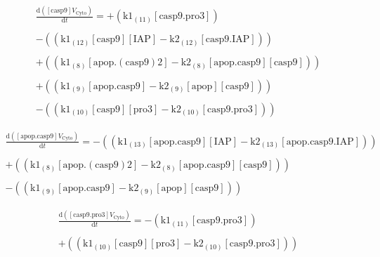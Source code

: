 \documentclass[a4paper,12pt]{article} %
\newcommand{\M}[1]{\mathrm{#1}}
\begin{document}
\begin{equation}
\begin{split}
\frac {\M{d}( {{\M{[casp9]}}    {V}_{\M{Cyto}} } ) }  {\M{d}{t} }  =  {  +  ( {{\M{k1}}_{\M{(11)}}    {\M{[casp9.pro3]}} } ) } \\ 
  \\ 
   {  -  (( {{\M{k1}}_{\M{(12)}}    {\M{[casp9]}}    {\M{[IAP]}}  -  {\M{k2}}_{\M{(12)}}    {\M{[casp9.IAP]}} } )) } \\ 
  \\ 
   {  +  (( {{\M{k1}}_{\M{(8)}}    {\M{[apop.(casp9)2]}}  -  {\M{k2}}_{\M{(8)}}    {\M{[apop.casp9]}}    {\M{[casp9]}} } )) } \\ 
  \\ 
   {  +  (( {{\M{k1}}_{\M{(9)}}    {\M{[apop.casp9]}}  -  {\M{k2}}_{\M{(9)}}    {\M{[apop]}}    {\M{[casp9]}} } )) } \\ 
  \\ 
   {  -  (( {{\M{k1}}_{\M{(10)}}    {\M{[casp9]}}    {\M{[pro3]}}  -  {\M{k2}}_{\M{(10)}}    {\M{[casp9.pro3]}} } )) } \end{split}
\end{equation}


\begin{equation}
\begin{split}
\frac {\M{d}( {{\M{[apop.casp9]}}    {V}_{\M{Cyto}} } ) }  {\M{d}{t} }  =  {  -  (( {{\M{k1}}_{\M{(13)}}    {\M{[apop.casp9]}}    {\M{[IAP]}}  -  {\M{k2}}_{\M{(13)}}    {\M{[apop.casp9.IAP]}} } )) } \\ 
  \\ 
   {  +  (( {{\M{k1}}_{\M{(8)}}    {\M{[apop.(casp9)2]}}  -  {\M{k2}}_{\M{(8)}}    {\M{[apop.casp9]}}    {\M{[casp9]}} } )) } \\ 
  \\ 
   {  -  (( {{\M{k1}}_{\M{(9)}}    {\M{[apop.casp9]}}  -  {\M{k2}}_{\M{(9)}}    {\M{[apop]}}    {\M{[casp9]}} } )) } 
\end{split}
\end{equation}

\begin{equation}
\begin{split}
\frac {\M{d}( {{\M{[casp9.pro3]}}    {V}_{\M{Cyto}} } ) }  {\M{d}{t} }  =  {  -  ( {{\M{k1}}_{\M{(11)}}    {\M{[casp9.pro3]}} } ) } \\ 
  \\ 
   {  +  (( {{\M{k1}}_{\M{(10)}}    {\M{[casp9]}}    {\M{[pro3]}}  -  {\M{k2}}_{\M{(10)}}    {\M{[casp9.pro3]}} } )) }
\end{split}
\end{equation}
\end{document}
